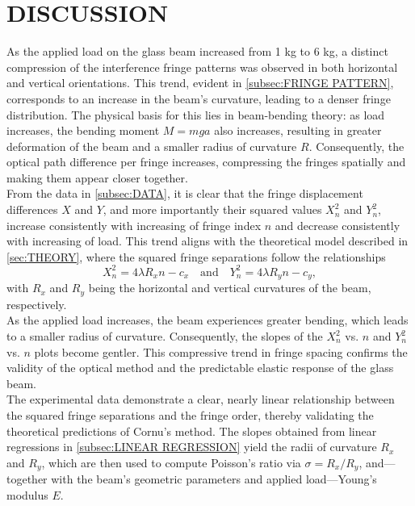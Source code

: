 \documentclass[a4paper,11pt]{article}
\begin{document}
\newpage
\section{\centering DISCUSSION}
\label{sec:DISCUSSION}
\indent 

As the applied load on the glass beam increased from 1 kg to 6 kg, a distinct compression of the interference fringe patterns was observed in both horizontal and vertical orientations. This trend, evident in \autoref{subsec:FRINGE PATTERN}, corresponds to an increase in the beam’s curvature, leading to a denser fringe distribution. The physical basis for this lies in beam-bending theory: as load increases, the bending moment \( M = mga \) also increases, resulting in greater deformation of the beam and a smaller radius of curvature \( R \). Consequently, the optical path difference per fringe increases, compressing the fringes spatially and making them appear closer together.\\

From the data in \autoref{subsec:DATA}, it is clear that the fringe displacement differences \( X \) and \( Y \), and more importantly their squared values \( X_n^2 \) and \( Y_n^2 \), increase consistently with increasing of fringe index \( n \) and decrease consistently with increasing of load. This trend aligns with the theoretical model described in \autoref{sec:THEORY}, where the squared fringe separations follow the relationships
\[
X_n^2 = 4\lambda R_x n - c_x \quad \text{and} \quad Y_n^2 = 4\lambda R_y n - c_y,
\]
with \(R_x\) and \(R_y\) being the horizontal and vertical curvatures of the beam, respectively.\\

As the applied load increases, the beam experiences greater bending, which leads to a smaller radius of curvature. Consequently, the slopes of the \( X_n^2 \) vs. \( n \) and \( Y_n^2 \) vs. \( n \) plots become gentler. This compressive trend in fringe spacing confirms the validity of the optical method and the predictable elastic response of the glass beam.\\

The experimental data demonstrate a clear, nearly linear relationship between the squared fringe separations and the fringe order, thereby validating the theoretical predictions of Cornu's method. The slopes obtained from linear regressions in \autoref{subsec:LINEAR REGRESSION} yield the radii of curvature \(R_x\) and \(R_y\), which are then used to compute Poisson's ratio via \(\sigma = R_x / R_y\), and—together with the beam's geometric parameters and applied load—Young's modulus \(E\).\\
\end{document}
